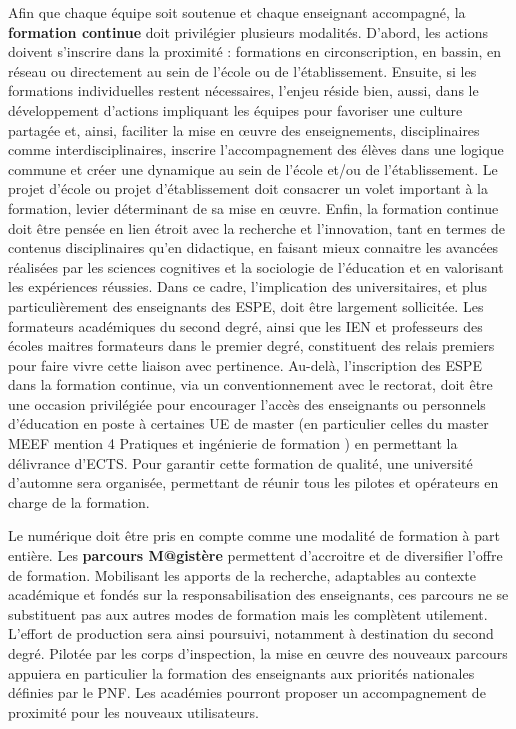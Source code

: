 Afin que chaque équipe soit soutenue et chaque enseignant accompagné, la \textbf{formation continue} doit privilégier plusieurs modalités. D’abord, les actions doivent s’inscrire dans la proximité : formations en circonscription, en bassin, en réseau ou directement au sein de l’école ou de l’établissement. Ensuite, si les formations individuelles restent nécessaires, l’enjeu réside bien, aussi, dans le développement d’actions impliquant les équipes pour favoriser une culture partagée et, ainsi, faciliter la mise en œuvre des enseignements, disciplinaires comme interdisciplinaires, inscrire l’accompagnement des élèves dans une logique commune et créer une dynamique au sein de l’école et/ou de l’établissement. Le projet d’école ou projet d’établissement doit consacrer un volet important à la formation, levier déterminant de sa mise en œuvre. Enfin, la formation continue doit être pensée en lien étroit avec la recherche et l’innovation, tant en termes de contenus disciplinaires qu’en didactique, en faisant mieux connaitre les avancées réalisées par les sciences cognitives et la sociologie de l’éducation et en valorisant les expériences réussies. Dans ce cadre, l’implication des universitaires, et plus particulièrement des enseignants des ESPE, doit être largement sollicitée. Les formateurs académiques du second degré, ainsi que les IEN et professeurs des écoles maitres formateurs dans le premier degré, constituent des relais premiers pour faire vivre cette liaison avec pertinence. Au-delà, l’inscription des ESPE dans la formation continue, via un conventionnement avec le rectorat, doit être une occasion privilégiée pour encourager l’accès des enseignants ou personnels d’éducation en poste à certaines UE de master (en particulier celles du master MEEF mention 4 \og Pratiques et ingénierie de formation \fg{}) en permettant la délivrance d’ECTS. Pour garantir cette formation de qualité, une université d’automne sera organisée, permettant de réunir tous les pilotes et opérateurs en charge de la formation.

Le numérique doit être pris en compte comme une modalité de formation à part entière. Les \textbf{parcours M@gistère} permettent d’accroitre et de diversifier l’offre de formation. Mobilisant les apports de la recherche, adaptables au contexte académique et fondés sur la responsabilisation des enseignants, ces parcours ne se substituent pas aux autres modes de formation mais les complètent utilement. L’effort de production sera ainsi poursuivi, notamment à destination du second degré. Pilotée par les corps d’inspection, la mise en œuvre des nouveaux parcours appuiera en particulier la formation des enseignants aux priorités nationales définies par le PNF. Les académies pourront proposer un accompagnement de proximité pour les nouveaux utilisateurs.

